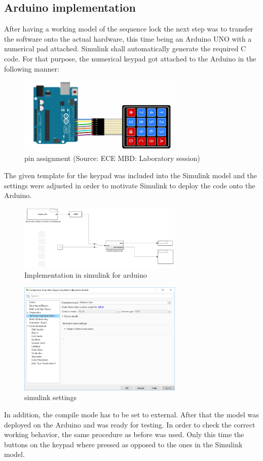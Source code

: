 \subsection{Arduino implementation}
After having a working model of the sequence lock the next step was to transfer the software onto the actual hardware, this time being an Arduino UNO with a numerical pad attached. Simulink shall automatically generate the required C code. For that purpose, the numerical keypad got attached to the Arduino in the following manner:
\begin{figure}[H]
		\centering
		\includegraphics[width=0.7\textwidth]{figures/arduino_wiring.png}
		\caption{pin assignment (Source: ECE MBD: Laboratory session)}
		\label{fig:scheme}
\end{figure}
The given template for the keypad was included into the Simulink model and the settings were adjusted in order to motivate Simulink to deploy the code onto the Arduino.
\begin{figure}[H]
		\centering
		\includegraphics[width=0.7\textwidth]{figures/arduino_implementation.png}
		\caption{Implementation in simulink for arduino}
		\label{fig:scheme}
\end{figure}
\begin{figure}[H]
		\centering
		\includegraphics[width=0.7\textwidth]{figures/simulink_settings.png}
		\caption{simulink settings}
		\label{fig:scheme}
\end{figure}
In addition, the compile mode has to be set to external. After that the model was deployed on the Arduino and was ready for testing. In order to check the correct working behavior, the same procedure as before was used. Only this time the buttons on the keypad where pressed as opposed to the ones in the Simulink model.

